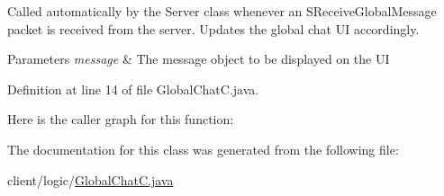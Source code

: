 Called automatically by the {\ttfamily Server} class whenever an {\ttfamily S\+Receive\+Global\+Message} packet is received from the server. Updates the global chat UI accordingly.


\begin{DoxyParams}{Parameters}
{\em message} & The message object to be displayed on the UI \\
\hline
\end{DoxyParams}


Definition at line 14 of file Global\+Chat\+C.\+java.

Here is the caller graph for this function\+:


The documentation for this class was generated from the following file\+:\begin{DoxyCompactItemize}
\item 
client/logic/\hyperlink{_global_chat_c_8java}{Global\+Chat\+C.\+java}\end{DoxyCompactItemize}
